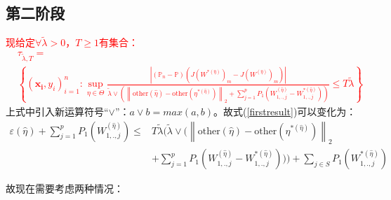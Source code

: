 \documentclass{article}
\begin{document}
\subsection{第二阶段}
\par \textcolor{red}{现给定$\forall\tilde{\lambda}>0$，$T\geq1$有集合：
\begin{equation}
	\begin{split}
		&\tau_{\tilde{\lambda},T}=\\&\left\{(\pmb{x_i},y_i)^n_{i=1}:\underset{\eta \in \Theta}{\sup}\frac{|(\mathbb{P}_n-\mathbb{P})(J(W^{*(\hat{\eta})})_m-J(W^{(\hat{\eta})})_m)|}{\tilde{\lambda}\vee(\left\|\text{other}(\hat{\eta})-\text{other}(\eta^{*(\hat{\eta})})\right\|_2+\sum_{j=1}^pP_1(W_{1,.,j}^{(\hat{\eta})}-W_{1,.,j}^{*(\hat{\eta})}))}\leq T\tilde{\lambda}\right\}
	\end{split}
\end{equation}
}上式中引入新运算符号“$\vee$”：$a\vee b=max(a,b)$。故式(\ref*{firstresult})可以变化为：
\begin{equation}\label{imp}
	\begin{split}
		\varepsilon(\hat{\eta})+\sum^p_{j=1}P_1(W_{1,.,j}^{(\hat{\eta})})\leq &T\tilde{\lambda}(\tilde{\lambda}\vee(\left\|\text{other}(\hat{\eta})-\text{other}(\eta^{*(\hat{\eta})})\right\|_2\\&+\sum_{j=1}^pP_1(W_{1,.,j}^{(\hat{\eta})}-W_{1,.,j}^{*(\hat{\eta})})))+\sum_{j\in S} P_1(W_{1,.,j}^{*(\hat{\eta})})
	\end{split}
\end{equation}
\par 故现在需要考虑两种情况：
\end{document}
